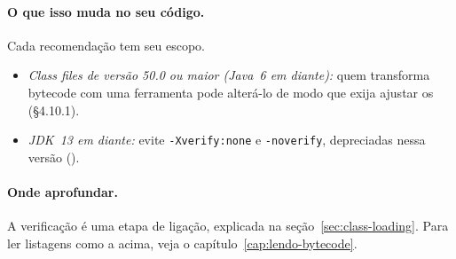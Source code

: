 \paragraph{O que isso muda no seu código.}
Cada recomendação tem seu escopo.
\begin{itemize}
\item \emph{Class files de versão 50.0 ou maior (Java~6 em diante):}
  quem transforma bytecode com uma ferramenta pode alterá-lo de modo que
  exija ajustar os 
  (§4.10.1).
\item \emph{JDK~13 em diante:} evite \texttt{-Xverify:none} e
  \texttt{-noverify}, depreciadas nessa versão
  ().
\end{itemize}

\paragraph{Onde aprofundar.}
A verificação é uma etapa de ligação, explicada na
seção~\ref{sec:class-loading}. Para ler listagens como a acima, veja o
capítulo~\ref{cap:lendo-bytecode}.
